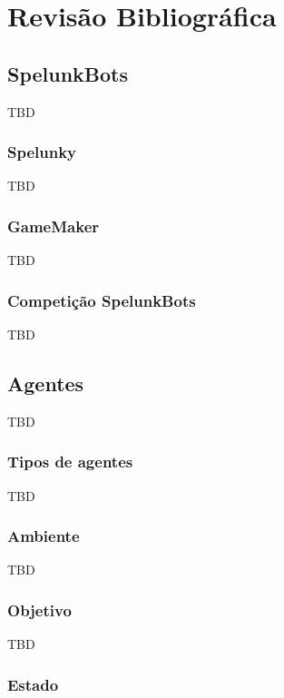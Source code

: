\chapter{\label{chap:lit-review}Revisão Bibliográfica}

\section{SpelunkBots}

TBD

\subsection{Spelunky}

TBD

\subsection{GameMaker}

TBD

\subsection{Competição SpelunkBots}

TBD

\section{Agentes}

TBD

\subsection{Tipos de agentes}

TBD

\subsection{Ambiente}

TBD

\subsection{Objetivo}

TBD

\subsection{Estado}

